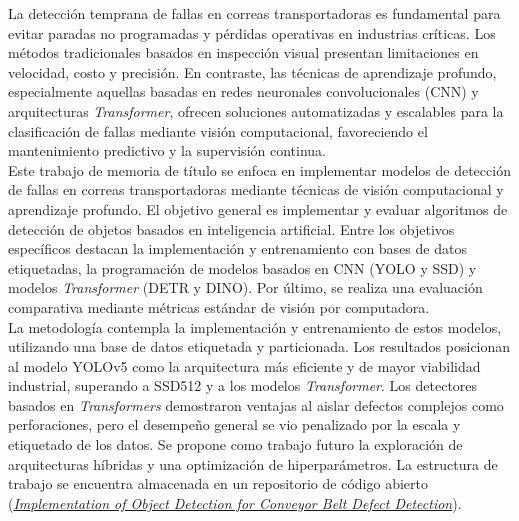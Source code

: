 La detección temprana de fallas en correas transportadoras es fundamental para evitar paradas no programadas y pérdidas operativas en industrias críticas. Los métodos tradicionales basados en inspección visual presentan limitaciones en velocidad, costo y precisión. En contraste, las técnicas de aprendizaje profundo, especialmente aquellas basadas en redes neuronales convolucionales (CNN) y arquitecturas \textit{Transformer}, ofrecen soluciones automatizadas y escalables para la clasificación de fallas mediante visión computacional, favoreciendo el mantenimiento predictivo y la supervisión continua.\\

Este trabajo de memoria de título se enfoca en implementar modelos de detección de fallas en correas transportadoras mediante técnicas de visión computacional y aprendizaje profundo. El objetivo general es implementar y evaluar algoritmos de detección de objetos basados en inteligencia artificial. Entre los objetivos específicos destacan la implementación y entrenamiento con bases de datos etiquetadas, la programación de modelos basados en CNN (YOLO y SSD) y modelos \textit{Transformer} (DETR y DINO). Por último, se realiza una evaluación comparativa mediante métricas estándar de visión por computadora.\\

La metodología contempla la implementación y entrenamiento de estos modelos, utilizando una base de datos etiquetada y particionada. Los resultados posicionan al modelo YOLOv5 como la arquitectura más eficiente y de mayor viabilidad industrial, superando a SSD512 y a los modelos \textit{Transformer}. Los detectores basados en \textit{Transformers} demostraron ventajas al aislar defectos complejos como perforaciones, pero el desempeño general se vio penalizado por la escala y etiquetado de los datos. Se propone como trabajo futuro la exploración de arquitecturas híbridas y una optimización de hiperparámetros. La estructura de trabajo se encuentra almacenada en un repositorio de código abierto (\href{https://github.com/FernandoN23/Implementation-of-Object-Detection-for-Conveyor-Belt-Defect-Detection}{\textit{Implementation of Object Detection for Conveyor Belt Defect Detection}}).\\
